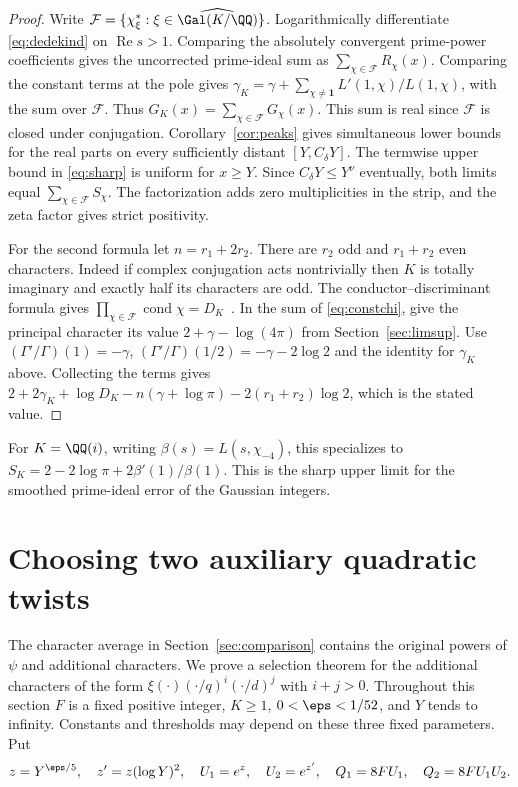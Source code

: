 \documentclass[a4paper,11pt]{article}
\theoremstyle{definition}
\theoremstyle{remark}
\newcommand{\real}{\operatorname{Re}}\newcommand{\imag}{\operatorname{Im}}
\numberwithin{equation}{section}
\begin{document}
\begin{proof}
Write \(\mathcal F=\{\chi_\xi^*:\xi\in\widehat{\Gal(K/\QQ)}\}\). Logarithmically differentiate \eqref{eq:dedekind} on \(\real s>1\). Comparing the absolutely convergent prime-power coefficients gives the uncorrected prime-ideal sum as \(\sum_{\chi\in\mathcal F}R_\chi(x)\). Comparing the constant terms at the pole gives \(\gamma_K=\gamma+\sum_{\chi\ne\mathbf1}L'(1,\chi)/L(1,\chi)\), with the sum over \(\mathcal F\). Thus \(G_K(x)=\sum_{\chi\in\mathcal F}G_\chi(x)\). This sum is real since \(\mathcal F\) is closed under conjugation. Corollary~\ref{cor:peaks} gives simultaneous lower bounds for the real parts on every sufficiently distant \([Y,C_\delta Y]\). The termwise upper bound in \eqref{eq:sharp} is uniform for \(x\ge Y\). Since \(C_\delta Y\le Y^\nu\) eventually, both limits equal \(\sum_{\chi\in\mathcal F} S_\chi\). The factorization adds zero multiplicities in the strip, and the zeta factor gives strict positivity.

For the second formula let \(n=r_1+2r_2\). There are \(r_2\) odd and \(r_1+r_2\) even characters. Indeed if complex conjugation acts nontrivially then \(K\) is totally imaginary and exactly half its characters are odd. The conductor--discriminant formula gives \(\prod_{\chi\in\mathcal F}\operatorname{cond}\chi=D_K\)~\cite[Ch.~V, Thm.~3.27]{I-I-I-milne}. In the sum of \eqref{eq:constchi}, give the principal character its value \(2+\gamma-\log(4\pi)\) from Section~\ref{sec:limsup}. Use \((\Gamma'/\Gamma)(1)=-\gamma\), \((\Gamma'/\Gamma)(1/2)=-\gamma-2\log2\) and the identity for \(\gamma_K\) above. Collecting the terms gives \(2+2\gamma_K+\log D_K-n(\gamma+\log\pi)-2(r_1+r_2)\log2\), which is the stated value.
\end{proof}
For \(K=\QQ(i)\), writing \(\beta(s)=L(s,\chi_{-4})\), this specializes to \(S_K=2-2\log\pi+2\beta'(1)/\beta(1)\). This is the sharp upper limit for the smoothed prime-ideal error of the Gaussian integers.

\section{Choosing two auxiliary quadratic twists}\label{nav:I-16}
\label{sec:twists}

The character average in Section~\ref{sec:comparison} contains the original powers of \(\psi\) and additional characters. We prove a selection theorem for the additional characters of the form \(\xi(\cdot)(\cdot/q)^i(\cdot/d)^j\) with \(i+j>0\). Throughout this section \(F\) is a fixed positive integer, \(K\ge1\), \(0<\eps<1/52\), and \(Y\) tends to infinity. Constants and thresholds may depend on these three fixed parameters. Put
\[
 z=Y^{\eps/5},\quad z'=z(\log Y)^2,\quad
 U_1=e^z,\quad U_2=e^{z'},\quad Q_1=8F U_1,\quad Q_2=8F U_1U_2 .
\]
\end{document}
